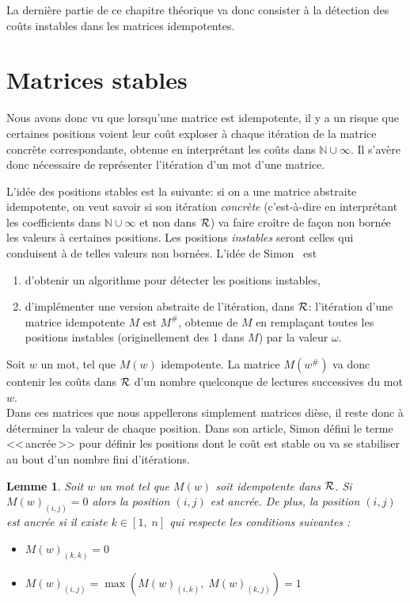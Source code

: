 \documentclass[12pt]{memoir}
\newtheorem{lemma}{Lemme}[section]
\begin{document}
\medskip
La dernière partie de ce chapitre théorique va donc consister à la détection
des coûts instables dans les matrices idempotentes.

\section{Matrices stables}
\label{sec:matrices-stables}

Nous avons donc vu que lorsqu'une matrice est idempotente, il y a un risque
que certaines positions voient leur coût exploser à chaque itération de 
la matrice concrète correspondante, obtenue en interprétant les coûts dans $\mathbb{N}\cup\infty$. Il s'avère donc nécessaire de représenter l'itération d'un mot d'une matrice.


L'idée des positions stables est la suivante: si on a une matrice abstraite
idempotente, on veut savoir si son itération \emph{concrète} (c'est-à-dire en
interprétant les coefficients dans $\mathbb{N}\cup\infty$ et non dans $\mathcal{R}$) va
faire croître de façon non bornée les valeurs à certaines positions.	 Les positions
\emph{instables} seront celles qui conduisent à de telles valeurs non
bornées. L'idée de Simon~\cite{Simon:Semigroups-Matrices-over-Tropical:1994:a} est 
\begin{enumerate}
\item d'obtenir un algorithme pour détecter les positions instables,
\item d'implémenter une version abstraite de l'itération, dans $\mathcal{R}$:
  l'itération d'une matrice idempotente $M$ est $M^\#$, obtenue de $M$ en
  remplaçant toutes les positions instables (originellement des 1 dans $M$)
  par la valeur $\omega$.
\end{enumerate}


Soit $w$ un mot, tel que $M(w)$ idempotente. La matrice $M(w^{\#})$ va donc contenir les coûts dans $\mathcal{R}$ d'un nombre quelconque de lectures successives du mot $w$.\\
Dans ces matrices que nous appellerons simplement matrices dièse, il reste donc à déterminer la valeur de chaque position. Dans son article, Simon défini le terme <<\,ancrée\,>> pour définir les positions dont le coût est stable ou va se stabiliser au bout d'un nombre fini d'itérations.
\begin{lemma}
  \label{lem:1}
  Soit $w$ un mot tel que $M(w)$ soit idempotente dans $\mathcal{R}$. Si
    $M(w)_{(i,j)} = 0$ alors la position $(i,j)$ est ancrée. De plus, la
    position $(i,j)$ est ancrée si il existe $k \in [1,\; n]$ qui respecte les
    conditions suivantes :
    \begin{itemize}
    \item $M(w)_{(k,k)} = 0$
    \item $M(w)_{(i,j)} =
      \max(M(w)_{(i,k)}, \; M(w)_{(k,j)}) = 1$
    \end{itemize}
\end{lemma}
\end{document}
